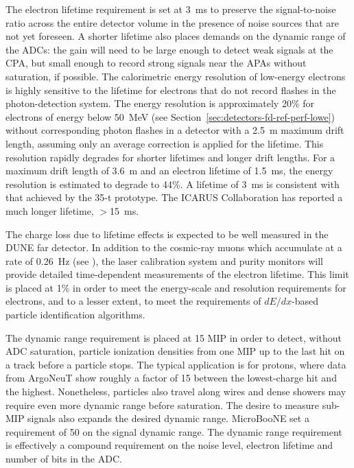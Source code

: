 The electron lifetime requirement is set at 3~ms to preserve the
signal-to-noise ratio across the entire detector volume in the
presence of noise sources that are not yet foreseen.  A shorter
lifetime also places demands on the dynamic range of the ADCs: the
gain will need to be large enough to detect weak signals at the CPA,
but small enough to record strong signals near the APAs without
saturation, if possible.  The calorimetric energy resolution of
low-energy electrons is highly sensitive to the lifetime for electrons
that do not record flashes in the photon-detection system.  The energy
resolution is approximately 20\% for electrons of energy below 50~MeV
(see Section~\ref{sec:detectors-fd-ref-perf-lowe}) without
corresponding photon flashes in a detector with a 2.5~m maximum drift
length, assuming only an average correction is applied for the
lifetime.  This resolution rapidly degrades for shorter lifetimes and
longer drift lengths.  For a maximum drift length of 3.6~m and an
electron lifetime of 1.5~ms, the energy resolution is estimated to
degrade to 44\%.  A lifetime of 3~ms is consistent with that achieved
by the 35-t prototype.  The ICARUS Collaboration has reported a much
longer lifetime, $>$15~ms\cite{Antonello:2014eha}.

The charge loss due to lifetime effects is expected to be well
measured in the DUNE far detector.  In addition to the cosmic-ray
muons which accumulate at a rate of 0.26~Hz (see \anxrates), the
laser calibration system and purity monitors will provide detailed
time-dependent measurements of the electron lifetime.  This
limit is placed at 1\% in order to meet the energy-scale and resolution
requirements for electrons, and to a lesser extent, to meet the requirements
of $dE/dx$-based particle identification algorithms.

The dynamic range requirement is placed at 15 MIP in order to detect,
without ADC saturation, particle ionization densities from one MIP up
to the last hit on a track before a particle stops.  The typical
application is for protons, where data from ArgoNeuT show roughly a
factor of 15 between the lowest-charge hit and the highest.
Nonetheless, particles also travel along wires and dense showers may
require even more dynamic range before saturation.  The desire to
measure sub-MIP signals also expands the desired dynamic range.
MicroBooNE set a requirement of 50 on the signal dynamic
range\cite{microboonetdr}.  The dynamic range requirement is
effectively a compound requirement on the noise level, electron
lifetime and number of bits in the ADC.

